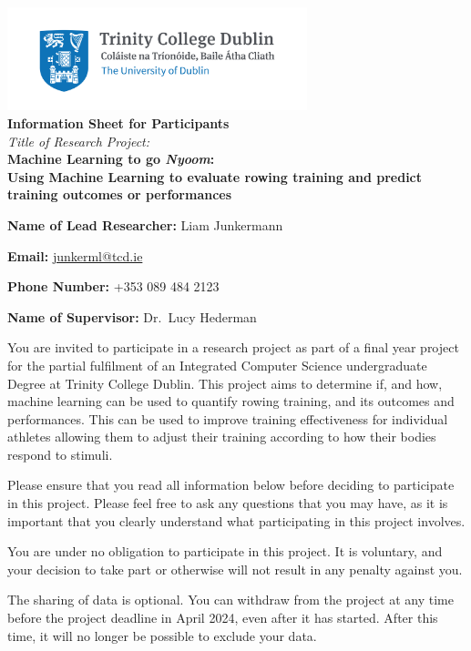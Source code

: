 \documentclass[a4paper,12pt]{article}
\newcommand{\authorname}{Liam Junkermann}
\newcommand{\deadline}{April 2024}
\begin{document}
\begin{center}
    \includegraphics[height=3cm]{Trinity_RGB_transparent_main.png}\\
    {\large\textbf{Information Sheet for Participants}}\\
    \textit{Title of Research Project:}\\
    \textbf{Machine Learning to go \emph{Nyoom}:}\\
    \textbf{Using Machine Learning to evaluate rowing training and predict training outcomes or performances}
\end{center}

\vspace{1cm}

\textbf{Name of Lead Researcher:} \authorname

\textbf{Email:} \href{mailto:junkerml@tcd.ie}{junkerml@tcd.ie}

\textbf{Phone Number:} +353 089 484 2123

\textbf{Name of Supervisor:} Dr.~Lucy Hederman

\vspace{1cm}

You are invited to participate in a research project as part of a final year project for the partial fulfilment of an Integrated Computer Science undergraduate Degree at Trinity College Dublin. This project aims to determine if, and how, machine learning can be used to quantify rowing training, and its outcomes and performances. This can be used to improve training effectiveness for individual athletes allowing them to adjust their training according to how their bodies respond to stimuli.

Please ensure that you read all information below before deciding to participate in this project. Please feel free to ask any questions that you may have, as it is important that you clearly understand what participating in this project involves.

You are under no obligation to participate in this project. It is voluntary, and your decision to take part or otherwise will not result in any penalty against you.

The sharing of data is optional. You can withdraw from the project at any time before the project deadline in \deadline, even after it has started. After this time, it will no longer be possible to exclude your data.
\end{document}
